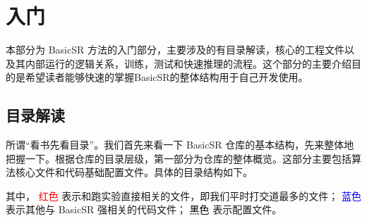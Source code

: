 \documentclass[../main.tex]{subfiles}
\begin{document}
\chapter{入门}
\vspace{-2cm}

本部分为 BasicSR 方法的入门部分，主要涉及的有目录解读，核心的工程文件以及其内部运行的逻辑关系，训练，测试和快速推理的流程。这个部分的主要介绍目的是希望读者能够快速的掌握BasicSR的整体结构用于自己开发使用。

\section{目录解读}\label{getting_start:content-overview}
所谓“看书先看目录”。我们首先来看一下 BasicSR 仓库的基本结构，先来整体地把握一下。根据仓库的目录层级，第一部分为仓库的整体概览。这部分主要包括算法核心文件和代码基础配置文件。具体的目录结构如下。

其中，\newline
\noindent\textcolor{red}{红色} 表示和跑实验直接相关的文件，即我们平时打交道最多的文件；\newline
\noindent\textcolor{blue}{蓝色} 表示其他与 BasicSR 强相关的代码文件；\newline
\noindent\textcolor{black}{黑色} 表示配置文件。
\end{document}
